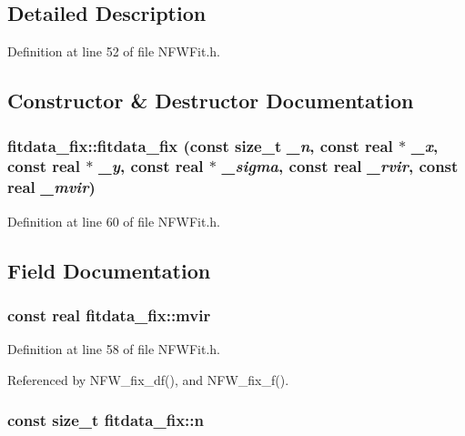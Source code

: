 \subsection{Detailed Description}


Definition at line 52 of file NFWFit.h.



\subsection{Constructor \& Destructor Documentation}
\subsubsection[{fitdata\_\-fix}]{\setlength{\rightskip}{0pt plus 5cm}fitdata\_\-fix::fitdata\_\-fix (const size\_\-t {\em \_\-n}, \/  const {\bf real} $\ast$ {\em \_\-x}, \/  const {\bf real} $\ast$ {\em \_\-y}, \/  const {\bf real} $\ast$ {\em \_\-sigma}, \/  const {\bf real} {\em \_\-rvir}, \/  const {\bf real} {\em \_\-mvir})}\label{structfitdata__fix_a4291430c5b63ba3f633deffeebed99e5}


Definition at line 60 of file NFWFit.h.



\subsection{Field Documentation}
\subsubsection[{mvir}]{\setlength{\rightskip}{0pt plus 5cm}const {\bf real} {\bf fitdata\_\-fix::mvir}}\label{structfitdata__fix_a07ea037ea7788024cb2c382236c661d3}


Definition at line 58 of file NFWFit.h.



Referenced by NFW\_\-fix\_\-df(), and NFW\_\-fix\_\-f().

\subsubsection[{n}]{\setlength{\rightskip}{0pt plus 5cm}const size\_\-t {\bf fitdata\_\-fix::n}}\label{structfitdata__fix_a30184cc397db6f5fb5c951c481095df0}


